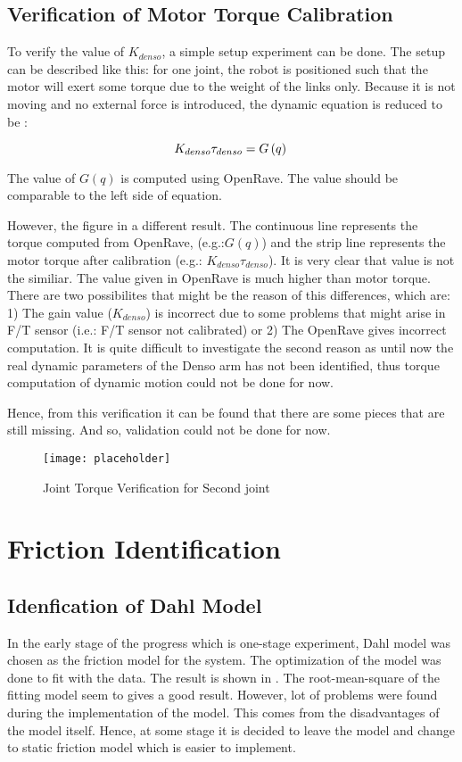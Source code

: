 \subsection{Verification of Motor Torque Calibration}
To verify the value of $K_{denso}$, a simple setup experiment can be done. The setup can be described like this: for one joint, the robot is positioned such that the motor will exert some torque due to the weight of the links only. Because it is not moving and no external force is introduced, the dynamic equation is reduced to be :

\begin{equation}
  K_{denso} \tau_{denso} = G\left(q \right) \\
\end{equation}

The value of $G\left(q \right)$ is computed using OpenRave. The value should be comparable to the left side of equation. 

However, the figure in  a different result. The continuous line represents the torque computed from OpenRave, (e.g.:$G\left(q \right)$) and the strip line represents the motor torque after calibration (e.g.: $K_{denso} \tau_{denso}$). It is very clear that value is not the similiar. The value given in OpenRave is much higher than motor torque. There are two possibilites that might be the reason of this differences, which are: 1) The gain value ($ K_{denso} $) is incorrect due to some problems that might arise in F/T sensor (i.e.: F/T sensor not calibrated) or 2) The OpenRave gives incorrect computation. It is quite difficult to investigate the second reason as until now the real dynamic parameters of the Denso arm has not been identified, thus torque computation of dynamic motion could not be done for now. 

Hence, from this verification it can be found that there are some pieces that are still missing. And so, validation could not be done for now.
 
\begin{figure}[h]
    \centering
    \texttt{[image: placeholder]}
    \caption{Joint Torque Verification for Second joint}
    \label{fig: tor verification}
\end{figure}


\section{Friction Identification}
\subsection{Idenfication of Dahl Model}
In the early stage of the progress which is one-stage experiment, Dahl model was chosen as the friction model for the system. The optimization of the model was done to fit with the data. The result is shown in . The root-mean-square of the fitting model seem to gives a good result. However, lot of problems were found during the implementation of the model. This comes from the disadvantages of the model itself. Hence, at some stage it is decided to leave the model and change to static friction model which is easier to implement.

